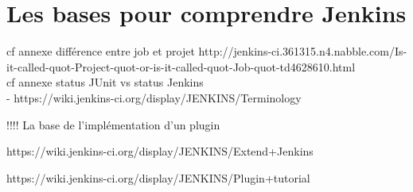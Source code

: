 \chapter{Les bases pour comprendre Jenkins}\label{annexe:jenkinsBasis}

cf annexe diff\'{e}rence entre job et projet http://jenkins-ci.361315.n4.nabble.com/Is-it-called-quot-Project-quot-or-is-it-called-quot-Job-quot-td4628610.html\\


cf annexe status JUnit vs status Jenkins\\

						-	https://wiki.jenkins-ci.org/display/JENKINS/Terminology
						
						
!!!! La base de l'impl\'{e}mentation d'un plugin


https://wiki.jenkins-ci.org/display/JENKINS/Extend+Jenkins


https://wiki.jenkins-ci.org/display/JENKINS/Plugin+tutorial
